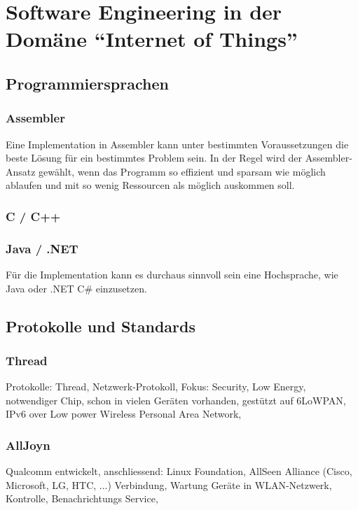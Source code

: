\chapter{Software Engineering in der Domäne "`Internet of Things"'}


\section{Programmiersprachen}

\subsection{Assembler}
Eine Implementation in Assembler kann unter bestimmten Voraussetzungen die beste Lösung für ein bestimmtes Problem sein. In der Regel wird der Assembler-Ansatz gewählt, wenn das Programm so effizient und sparsam wie möglich ablaufen und mit so wenig Ressourcen als möglich auskommen soll.



\subsection{C / C++}


\subsection{Java / .NET}
Für die Implementation kann es durchaus sinnvoll sein eine Hochsprache, wie Java oder .NET C\# einzusetzen. 

\section{Protokolle und Standards}

\subsection{Thread}
Protokolle: Thread, Netzwerk-Protokoll, Fokus: Security, Low Energy, notwendiger Chip, schon in vielen Geräten vorhanden, gestützt auf 6LoWPAN, IPv6 over Low power Wireless Personal Area Network, 


\subsection{AllJoyn}
Qualcomm entwickelt, anschliessend: Linux Foundation, AllSeen Alliance (Cisco, Microsoft, LG, HTC, ...)
Verbindung, Wartung Geräte in WLAN-Netzwerk, Kontrolle, Benachrichtungs Service, 

